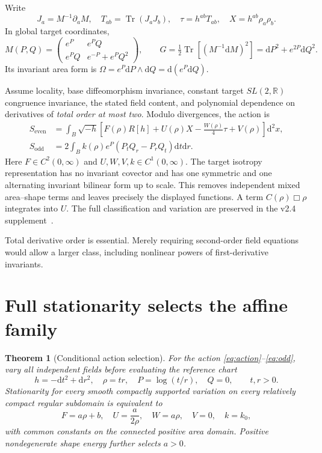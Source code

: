 \documentclass[11pt]{article}
\newtheorem{theorem}{Theorem}[section]
\newcommand{\Tr}{\operatorname{Tr}}
\newcommand{\dd}{\mathrm d}
\newcommand{\R}{\mathbb R}
\begin{document}
Write
\begin{equation}
J_a=M^{-1}\partial_aM,\quad T_{ab}=\Tr(J_aJ_b),\quad
\tau=h^{ab}T_{ab},\quad X=h^{ab}\rho_a\rho_b.
\end{equation}
In global target coordinates,
\begin{equation}\label{eq:target}
M(P,Q)=\begin{pmatrix}e^P&e^PQ\\e^PQ&e^{-P}+e^PQ^2\end{pmatrix},
\qquad G=\tfrac12\Tr[(M^{-1}\dd M)^2]=\dd P^2+e^{2P}\dd Q^2.
\end{equation}
Its invariant area form is $\Omega=e^P\dd P\wedge\dd Q=\dd(e^P\dd Q)$.

Assume locality, base diffeomorphism invariance, constant target $SL(2,\R)$ congruence invariance, the stated field content, and polynomial dependence on derivatives of \emph{total order at most two}. Modulo divergences, the action is
\begin{align}
S_{\mathrm{even}}&=\int_B\sqrt{-h}\left[F(\rho)R[h]+U(\rho)X-\frac{W(\rho)}4\tau+V(\rho)\right]\dd^2x,\label{eq:action}\\
S_{\mathrm{odd}}&=2\int_B k(\rho)e^P(P_tQ_r-P_rQ_t)\dd t\dd r.\label{eq:odd}
\end{align}
Here $F\in C^2(0,\infty)$ and $U,W,V,k\in C^1(0,\infty)$. The target isotropy representation has no invariant covector and has one symmetric and one alternating invariant bilinear form up to scale. This removes independent mixed area--shape terms and leaves precisely the displayed functions. A term $C(\rho)\Box\rho$ integrates into $U$. The full classification and variation are preserved in the v2.4 supplement~\cite{Voss24}.

Total derivative order is essential. Merely requiring second-order field equations would allow a larger class, including nonlinear powers of first-derivative invariants.

\section{Full stationarity selects the affine family}
\begin{theorem}[Conditional action selection]\label{thm:selection}
For the action \eqref{eq:action}--\eqref{eq:odd}, vary all independent fields before evaluating the reference chart
\begin{equation}\label{eq:chart}
h=-\dd t^2+\dd r^2,\quad \rho=tr,\quad P=\log(t/r),\quad Q=0,\qquad t,r>0.
\end{equation}
Stationarity for every smooth compactly supported variation on every relatively compact regular subdomain is equivalent to
\begin{equation}\label{eq:selected}
F=a\rho+b,\quad U=\frac a{2\rho},\quad W=a\rho,\quad V=0,\quad k=k_0,
\end{equation}
with common constants on the connected positive area domain. Positive nondegenerate shape energy further selects $a>0$.
\end{theorem}
\end{document}
